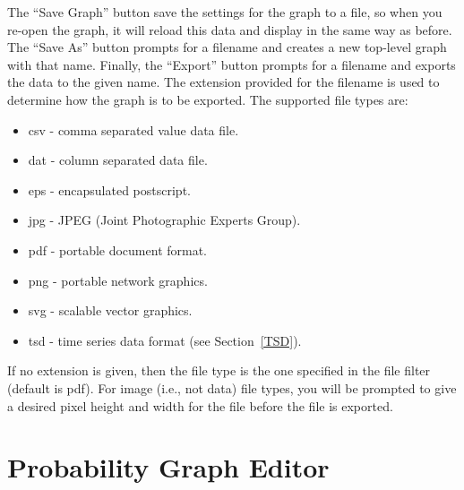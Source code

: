 \documentclass[titlepage,11pt]{article}
\begin{document}
The ``Save Graph'' button save the settings for the graph to 
a file, so when you re-open the graph, it will reload this data and display 
in the same way as before.  The ``Save As'' button prompts for a 
filename and creates a new top-level graph with that name.  
Finally, the ``Export'' button prompts for a filename and exports
the data to the given name.  The extension provided for the filename 
is used to determine how the graph is to be exported. The
supported file types are: 
\begin{itemize}
\item csv - comma separated value data file. 
\item dat - column separated data file. 
\item eps - encapsulated postscript. 
\item jpg - JPEG (Joint Photographic Experts Group). 
\item pdf - portable document format.
\item png - portable network graphics. 
\item svg - scalable vector graphics.
\item tsd - time series data format (see Section~\ref{TSD}).
\end{itemize}
If no extension is given, then the file type is the one
specified in the file filter (default is pdf).  For image (i.e.,
not data) file types, you will be prompted to give a desired
pixel height and width for the file before the file is exported. 

\section{\label{ProbEdit}Probability Graph Editor}
\end{document}
